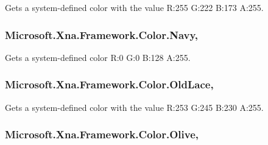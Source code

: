 Gets a system-\/defined color with the value R\+:255 G\+:222 B\+:173 A\+:255.

\hypertarget{struct_microsoft_1_1_xna_1_1_framework_1_1_color_a6266670e20b599f82a41a0052a043f00}{}
\subsubsection[{Navy}]{ Microsoft.\+Xna.\+Framework.\+Color.\+Navy\hspace{0.3cm}{\ttfamily [static]}, {\ttfamily [get]}}\label{struct_microsoft_1_1_xna_1_1_framework_1_1_color_a6266670e20b599f82a41a0052a043f00}


Gets a system-\/defined color R\+:0 G\+:0 B\+:128 A\+:255.

\hypertarget{struct_microsoft_1_1_xna_1_1_framework_1_1_color_a3aef813721814ce947b002b9b51844f7}{}
\subsubsection[{Old\+Lace}]{ Microsoft.\+Xna.\+Framework.\+Color.\+Old\+Lace\hspace{0.3cm}{\ttfamily [static]}, {\ttfamily [get]}}\label{struct_microsoft_1_1_xna_1_1_framework_1_1_color_a3aef813721814ce947b002b9b51844f7}


Gets a system-\/defined color with the value R\+:253 G\+:245 B\+:230 A\+:255.

\hypertarget{struct_microsoft_1_1_xna_1_1_framework_1_1_color_ac750de15acc22ff050c8c0b725771192}{}
\subsubsection[{Olive}]{ Microsoft.\+Xna.\+Framework.\+Color.\+Olive\hspace{0.3cm}{\ttfamily [static]}, {\ttfamily [get]}}\label{struct_microsoft_1_1_xna_1_1_framework_1_1_color_ac750de15acc22ff050c8c0b725771192}


